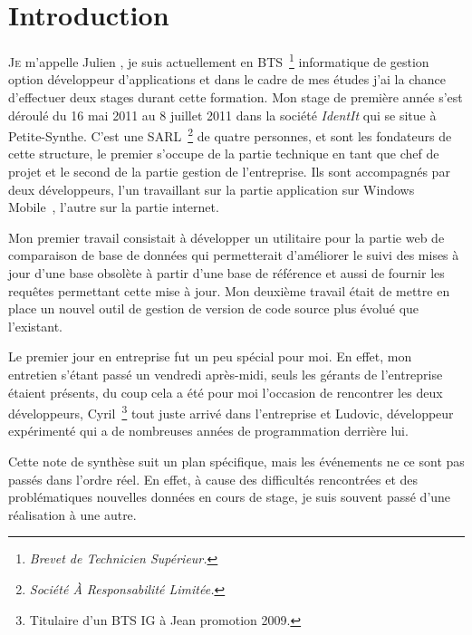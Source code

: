 \chapter{Introduction} %
\label{cha:Introduction}

\lettrine{J}{e} m'appelle Julien , je suis actuellement en
BTS\, \footnote{\emph{Brevet de Technicien Supérieur.}} informatique de
gestion option développeur d'applications et dans le cadre de mes études
j'ai la chance d'effectuer deux stages durant cette formation. Mon stage
de première année s'est déroulé du 16 mai 2011 au 8 juillet 2011 dans la
société \emph{IdentIt} qui se situe à Petite-Synthe. C'est une SARL\,
\footnote{\emph{Société À Responsabilité Limitée.}} de quatre personnes,
 et  sont les fondateurs de cette
structure, le premier s'occupe de la partie technique en tant que chef
de projet et le second de la partie gestion de l'entreprise. Ils sont
accompagnés par deux développeurs, l'un travaillant sur la partie
application sur Windows Mobile~\textregistered, l'autre sur la partie
internet.

Mon premier travail consistait à développer un utilitaire pour la partie
web de comparaison de base de données qui permetterait d'améliorer le
suivi des mises à jour d'une base obsolète à partir d'une base de
référence et aussi de fournir les requêtes permettant cette mise à jour.
Mon deuxième travail était de mettre en place un nouvel outil de gestion
de version de code source plus évolué que l'existant.

Le premier jour en entreprise fut un peu spécial pour moi. En effet, mon
entretien s'étant passé un vendredi après-midi, seuls les gérants de
l'entreprise étaient présents, du coup cela a été pour moi l'occasion de
rencontrer les deux développeurs, Cyril\, \footnote{Titulaire d'un BTS
IG à Jean  promotion 2009.} tout juste arrivé dans
l'entreprise et Ludovic, développeur expérimenté qui a de nombreuses
années de programmation derrière lui.

Cette note de synthèse suit un plan spécifique, mais les événements ne
ce sont pas passés dans l'ordre réel. En effet, à cause des difficultés
rencontrées et des problématiques nouvelles données en cours de stage,
je suis souvent passé d'une réalisation à une autre.
